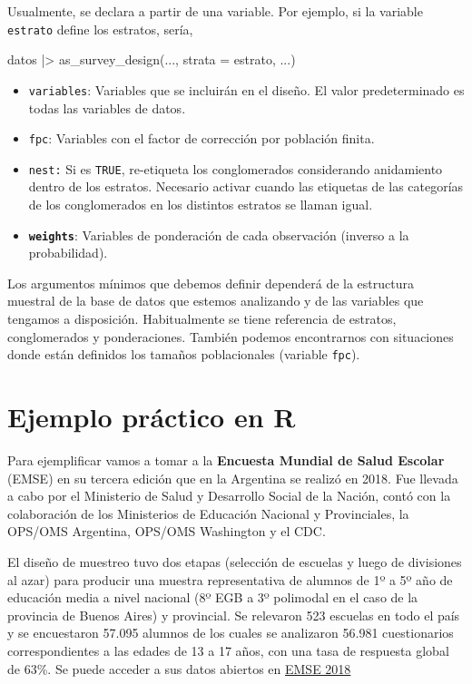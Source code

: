 \documentclass[
  spanish,
  a4paper,
]{scrbook}
\newenvironment{Shaded}{\begin{snugshade}}{\end{snugshade}}
\newcommand{\AttributeTok}[1]{\textcolor[rgb]{0.40,0.45,0.13}{#1}}
\newcommand{\FunctionTok}[1]{\textcolor[rgb]{0.28,0.35,0.67}{#1}}
\newcommand{\NormalTok}[1]{\textcolor[rgb]{0.00,0.23,0.31}{#1}}
\newcommand{\SpecialCharTok}[1]{\textcolor[rgb]{0.37,0.37,0.37}{#1}}
\begin{document}
Usualmente, se declara a partir de una variable. Por ejemplo, si la
variable \texttt{estrato} define los estratos, sería,

\begin{Shaded}
\begin{Highlighting}[]
\NormalTok{datos }\SpecialCharTok{|\textgreater{}}
  \FunctionTok{as\_survey\_design}\NormalTok{(..., }\AttributeTok{strata =}\NormalTok{ estrato, ...)}
\end{Highlighting}
\end{Shaded}

\begin{itemize}
\item
  \texttt{variables}: Variables que se incluirán en el diseño. El valor
  predeterminado es todas las variables de datos.
\item
  \texttt{fpc}: Variables con el factor de corrección por población
  finita.
\item
  \texttt{nest:} Si es \texttt{TRUE}, re-etiqueta los conglomerados
  considerando anidamiento dentro de los estratos. Necesario activar
  cuando las etiquetas de las categorías de los conglomerados en los
  distintos estratos se llaman igual.
\item
  \textbf{\texttt{weights}}: Variables de ponderación de cada
  observación (inverso a la probabilidad).
\end{itemize}

Los argumentos mínimos que debemos definir dependerá de la estructura
muestral de la base de datos que estemos analizando y de las variables
que tengamos a disposición. Habitualmente se tiene referencia de
estratos, conglomerados y ponderaciones. También podemos encontrarnos
con situaciones donde están definidos los tamaños poblacionales
(variable \texttt{fpc}).

\section{Ejemplo práctico en R}\label{ejemplo-pruxe1ctico-en-r-3}

Para ejemplificar vamos a tomar a la \textbf{Encuesta Mundial de Salud
Escolar} (EMSE) en su tercera edición que en la Argentina se realizó en
2018. Fue llevada a cabo por el Ministerio de Salud y Desarrollo Social
de la Nación, contó con la colaboración de los Ministerios de Educación
Nacional y Provinciales, la OPS/OMS Argentina, OPS/OMS Washington y el
CDC.

El diseño de muestreo tuvo dos etapas (selección de escuelas y luego de
divisiones al azar) para producir una muestra representativa de alumnos
de 1º a 5º año de educación media a nivel nacional (8º EGB a 3º
polimodal en el caso de la provincia de Buenos Aires) y provincial. Se
relevaron 523 escuelas en todo el país y se encuestaron 57.095 alumnos
de los cuales se analizaron 56.981 cuestionarios correspondientes a las
edades de 13 a 17 años, con una tasa de respuesta global de 63\%. Se
puede acceder a sus datos abiertos en
\href{http://datos.salud.gob.ar/dataset/base-de-datos-de-la-3-encuesta-mundial-de-salud-escolar-emse-con-resultados-nacionales-argentina}{EMSE
2018}
\end{document}
